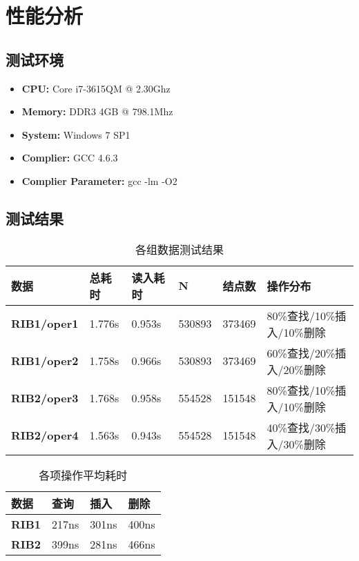 
\section{性能分析}

\subsection{测试环境}

\begin{itemize}
\item \textbf{CPU:} Core i7-3615QM @ 2.30Ghz
\item \textbf{Memory:} DDR3 4GB @ 798.1Mhz
\item \textbf{System:} Windows 7 SP1
\item \textbf{Complier:} GCC 4.6.3
\item \textbf{Complier Parameter:} gcc -lm -O2
\end{itemize}

\subsection{测试结果}

\begin{table}[h]
\centering
\begin{tabular}{|l|l|l|l|l|l|}
\hline
\textbf{数据} & \textbf{总耗时} & \textbf{读入耗时} & \textbf{N} & \textbf{结点数} & \textbf{操作分布} \\ \hline
\textbf{RIB1/oper1} & 1.776s & 0.953s & 530893 & 373469 & 80\%查找/10\%插入/10\%删除 \\ \hline
\textbf{RIB1/oper2} & 1.758s & 0.966s & 530893 & 373469 & 60\%查找/20\%插入/20\%删除 \\ \hline
\textbf{RIB2/oper3} & 1.768s & 0.958s & 554528 & 151548 & 80\%查找/10\%插入/10\%删除 \\ \hline
\textbf{RIB2/oper4} & 1.563s & 0.943s & 554528 & 151548 & 40\%查找/30\%插入/30\%删除 \\ \hline
\end{tabular}
\caption{各组数据测试结果}
\end{table}

\begin{table}[h]
\centering
\begin{tabular}{|l|l|l|l|}
\hline
\textbf{数据} & \textbf{查询} & \textbf{插入} & \textbf{删除} \\ \hline
\textbf{RIB1} & 217ns & 301ns & 400ns \\ \hline
\textbf{RIB2} & 399ns & 281ns & 466ns \\ \hline
\end{tabular}
\caption{各项操作平均耗时}
\end{table}

